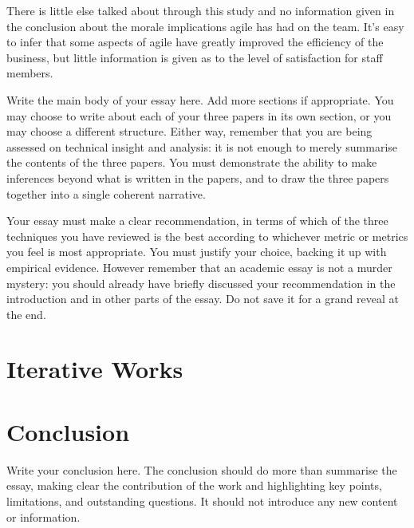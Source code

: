 \documentclass{scrartcl}
\begin{document}
There is little else talked about through this study and no information given in the conclusion about the morale implications agile has had on the team. It's easy to infer that some aspects of agile have greatly improved the efficiency of the business, but little information is given as to the level of satisfaction for staff members.

Write the main body of your essay here. Add more sections if appropriate. You may choose to write about each of your three papers in its own section, or you may choose a different structure. Either way, remember that you are being assessed on technical insight and analysis: it is not enough to merely summarise the contents of the three papers. You must demonstrate the ability to make inferences beyond what is written in the papers, and to draw the three papers together into a single coherent narrative.

Your essay must make a clear recommendation, in terms of which of the three techniques you have reviewed is the best according to whichever metric or metrics you feel is most appropriate. You must justify your choice, backing it up with empirical evidence. However remember that an academic essay is not a murder mystery: you should already have briefly discussed your recommendation in the introduction and in other parts of the essay. Do not save it for a grand reveal at the end.

\section{Iterative Works}


\section{Conclusion}

Write your conclusion here. The conclusion should do more than summarise the essay, making clear the contribution of the work and highlighting key points, limitations, and outstanding questions. It should not introduce any new content or information.



\end{document}
